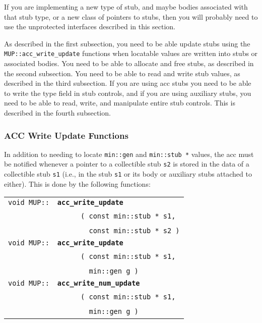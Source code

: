 \documentclass[12pt]{article}
\makeatletter
\newcommand{\ttindex}[1]{\index{#1@{\tt #1}}}
\newcommand{\MUPindex}[1]{\ttindex{MUP::#1}\ttindex{#1}}
\newcommand{\EOL}{\penalty \exhyphenpenalty}
\newenvironment{indpar}[1][0.3in]%
	{\begin{list}{}%
		     {\setlength{\itemsep}{0in}%
		      \setlength{\topsep}{0in}%
		      \setlength{\parsep}{1ex}%
		      \setlength{\labelwidth}{#1}%
		      \setlength{\leftmargin}{#1}%
		      \addtolength{\leftmargin}{\labelsep}}%
	 \item}%
	{\end{list}}
\newcommand{\LABEL}[1]{\label{#1}}
\newcommand{\ARGBREAK}{\\&{\tt ~~~~}}
\newcommand{\MUPKEY}[1]{{\tt \bf #1}\MUPindex{#1}}
\makeatother
\begin{document}
If you are implementing a new type of stub, and maybe bodies
associated with that stub type, or a new class of pointers to stubs,
then you will probably need to use the unprotected
interfaces described in this section.

As described in the first subsection, you need to be able update stubs
using the {\tt MUP::\EOL acc\_\EOL write\_\EOL update} functions
when locatable values are written into stubs or associated bodies.
You need to be able to allocate and free stubs, as described in the
second subsection.  You need to be able to read and write stub values,
as described in the third subsection.  If you are using acc stubs you
need to be able to write the type field in stub controls, and if
you are using auxiliary stubs, you need to be able to read, write,
and manipulate entire stub controls.
This is described in the fourth subsection.

\subsubsection{ACC Write Update Functions}
\label{ACC-WRITE-UPDATE-FUNCTIONS}

In addition to needing to locate \verb|min::gen|
and {\tt min::\EOL stub~*} values, the acc
must be notified whenever a pointer to a collectible stub \verb|s2|
is stored in the data of a collectible stub \verb|s1| (i.e., in
the stub \verb|s1| or its body or auxiliary stubs attached to either).
This is done by the following functions:

\begin{indpar}\begin{tabular}{r@{}l}
\verb|void MUP::|
    & \MUPKEY{acc\_write\_update}\ARGBREAK
          \verb| ( const min::stub * s1,|\ARGBREAK
	  \verb|   const min::stub * s2 )|
\LABEL{MUP::ACC_WRITE_STUB_UPDATE} \\
\verb|void MUP::|
    & \MUPKEY{acc\_write\_update}\ARGBREAK
          \verb| ( const min::stub * s1,|\ARGBREAK
	  \verb|   min::gen g )|
\LABEL{MUP::ACC_WRITE_GEN_UPDATE} \\
\verb|void MUP::|
    & \MUPKEY{acc\_write\_num\_update}\ARGBREAK
          \verb| ( const min::stub * s1,|\ARGBREAK
	  \verb|   min::gen g )|
\LABEL{MUP::ACC_WRITE_NUM_GEN_UPDATE} \\
\end{tabular}\end{indpar}
\end{document}
